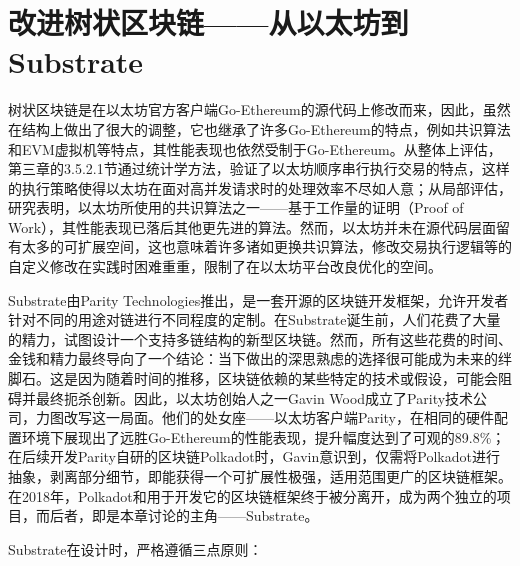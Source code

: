 %
%
%
%
%

\chapter{改进树状区块链——从以太坊到Substrate}

树状区块链是在以太坊官方客户端Go-Ethereum的源代码上修改而来，因此，虽然在结构上做出了很大的调整，它也继承了许多Go-Ethereum的特点，例如共识算法和EVM虚拟机等特点，其性能表现也依然受制于Go-Ethereum。从整体上评估，第三章的3.5.2.1节通过统计学方法，验证了以太坊顺序串行执行交易的特点，这样的执行策略使得以太坊在面对高并发请求时的处理效率不尽如人意；从局部评估，研究\cite{privateChainConsensus}表明，以太坊所使用的共识算法之一——基于工作量的证明（Proof of Work），其性能表现已落后其他更先进的算法。然而，以太坊并未在源代码层面留有太多的可扩展空间，这也意味着许多诸如更换共识算法，修改交易执行逻辑等的自定义修改在实践时困难重重，限制了在以太坊平台改良优化的空间。

Substrate\cite{substrateHome}由Parity Technologies推出，是一套开源的区块链开发框架，允许开发者针对不同的用途对链进行不同程度的定制。在Substrate诞生前，人们花费了大量的精力，试图设计一个支持多链结构的新型区块链。然而，所有这些花费的时间、金钱和精力最终导向了一个结论：当下做出的深思熟虑的选择很可能成为未来的绊脚石。这是因为随着时间的推移，区块链依赖的某些特定的技术或假设，可能会阻碍并最终扼杀创新\cite{substrateDoc}。因此，以太坊创始人之一Gavin Wood成立了Parity技术公司，力图改写这一局面。他们的处女座——以太坊客户端Parity，在相同的硬件配置环境下展现出了远胜Go-Ethereum的性能表现，提升幅度达到了可观的89.8\%\cite{parityVSgeth}；在后续开发Parity自研的区块链Polkadot时，Gavin意识到，仅需将Polkadot进行抽象，剥离部分细节，即能获得一个可扩展性极强，适用范围更广的区块链框架。在2018年，Polkadot和用于开发它的区块链框架终于被分离开，成为两个独立的项目，而后者，即是本章讨论的主角——Substrate。

Substrate在设计时，严格遵循三点原则：

